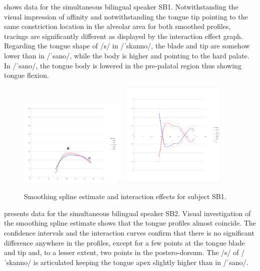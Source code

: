\documentclass[output=paper]{LSP/langsci}
\begin{document}
 shows data for the simultaneous bilingual speaker SB1. Notwithstanding the visual impression of affinity and notwithstanding the tongue tip pointing to the same constriction location in the alveolar area for both smoothed profiles, tracings are significantly different as displayed by the interaction effect graph. Regarding the tongue shape of /s/ in /ˈskanno/, the blade and tip are somehow lower than in /ˈsano/, while the body is higher and pointing to the hard palate. In /ˈsano/, the tongue body is lowered in the pre-palatal region thus showing tongue flexion.
  
\begin{figure}[t]
\includegraphics[width=0.45\textwidth]{illustrations/sprea_fig3a}~
\includegraphics[width=0.45\textwidth,trim=4 68 4 32,clip]{illustrations/sprea_fig3b}
\caption{Smoothing spline estimate and interaction effects for subject SB1.}
\label{fig:sprea:3}  
\end{figure}

 presents data for the simultaneous bilingual speaker SB2. Visual investigation of the smoothing spline estimate shows that the tongue profiles almost coincide. The confidence intervals and the interaction curves confirm that there is no significant difference anywhere in the profiles, except for a few points at the tongue blade and tip and, to a lesser extent, two points in the postero-dorsum. The /s/ of /ˈskanno/ is articulated keeping the tongue apex slightly higher than in /ˈsano/.
  
\end{document}
